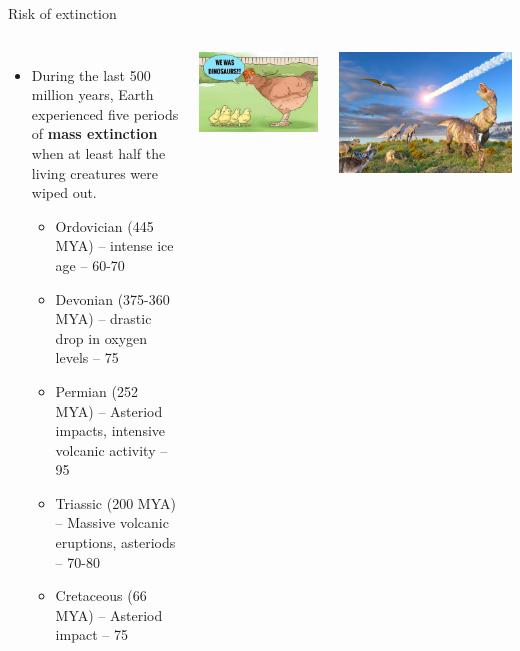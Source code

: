 \documentclass[
  ignorenonframetext,
  aspectratio=169]{beamer}
\providecommand{\tightlist}{%
  \setlength{\itemsep}{0pt}\setlength{\parskip}{0pt}}
\newcommand{\bcolumns}{\begin{columns}[T, onlytextwidth]}
\newcommand{\ecolumns}{\end{columns}}
\begin{document}
\begin{frame}{Risk of extinction}
\protect\hypertarget{risk-of-extinction}{}
\bcolumns
{}

\begin{itemize}
\tightlist
\item
  During the last 500 million years, Earth experienced five periods of
  \textbf{mass extinction} when at least half the living creatures were
  wiped out.

  \begin{itemize}
  \item Ordovician (445 MYA) -- intense ice age -- 60-70%
  \item Devonian (375-360 MYA) -- drastic drop in oxygen levels -- 75%
  \item Permian (252 MYA) -- Asteriod impacts, intensive volcanic activity -- 95%
  \item Triassic (200 MYA) -- Massive volcanic eruptions, asteriods -- 70-80%
  \item Cretaceous (66 MYA) -- Asteriod impact -- 75%
  \end{itemize}
\end{itemize}


\begin{center}\includegraphics[width=0.36\linewidth]{../images/we_was_dinasaurs} \end{center}

\begin{center}\includegraphics[width=0.98\linewidth]{../images/mass_extinction_illustration} \end{center}

\ecolumns
\end{frame}
\end{document}
